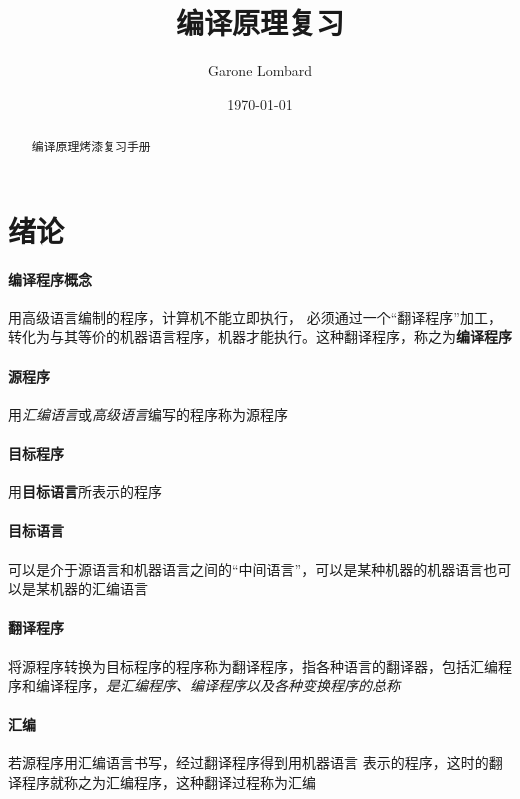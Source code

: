 \documentclass[UTF8]{ctexart} %
\title{编译原理复习}
\author{Garone Lombard}
\date{\today}
\begin{document}
\maketitle %

\newpage

\begin{abstract}
    编译原理烤漆复习手册
\end{abstract}

\newpage

\tableofcontents

\newpage

\section{绪论}

\paragraph{编译程序概念} 用高级语言编制的程序，计算机不能立即执行， 必须通过一个“翻译程序”加工，转化为与其等价的机器语言程序，机器才能执行。这种翻译程序，称之为\textbf{编译程序}

\paragraph{源程序} 用\emph{汇编语言}或\emph{高级语言}编写的程序称为源程序

\paragraph{目标程序} 用\textbf{目标语言}所表示的程序

\paragraph{目标语言} 可以是介于源语言和机器语言之间的“中间语言”，可以是某种机器的机器语言也可以是某机器的汇编语言

\paragraph{翻译程序} 将源程序转换为目标程序的程序称为翻译程序，指各种语言的翻译器，包括汇编程序和编译程序，\emph{是汇编程序、编译程序以及各种变换程序的总称}

\paragraph{汇编} 若源程序用汇编语言书写，经过翻译程序得到用机器语言 表示的程序，这时的翻译程序就称之为汇编程序，这种翻译过程称为汇编
\end{document}
